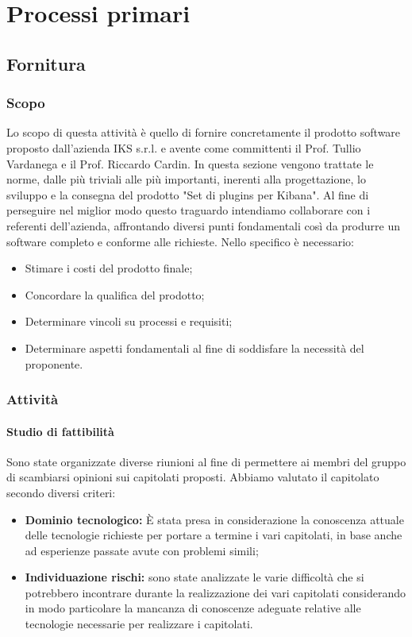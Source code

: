 \section{Processi primari}

\subsection{Fornitura}
	
	\subsubsection{Scopo}
	Lo scopo di questa attività è quello di fornire concretamente il prodotto software proposto dall'azienda IKS s.r.l. e avente come committenti il Prof. Tullio Vardanega e il Prof. Riccardo Cardin.
	In questa sezione vengono trattate le norme, dalle più triviali alle più importanti, inerenti alla progettazione, lo sviluppo e la consegna del prodotto "Set di plugins per Kibana".
	Al fine di perseguire nel miglior modo questo traguardo intendiamo collaborare con i referenti dell'azienda, affrontando diversi punti fondamentali così da produrre un software completo e conforme alle richieste. Nello specifico è necessario:
    \begin{itemize}
	\item Stimare i costi del prodotto finale;
	\item Concordare la qualifica del prodotto;
	\item Determinare vincoli su processi e requisiti;
	\item Determinare aspetti fondamentali al fine di soddisfare la necessità del proponente.
	\end{itemize}
	\subsubsection{Attività} 
		\paragraph{Studio di fattibilità} \Spazio
		Sono state organizzate diverse riunioni al fine di permettere ai membri del gruppo di scambiarsi opinioni sui capitolati proposti. 
		Abbiamo valutato il capitolato secondo diversi criteri:
		\begin{itemize}
			\item \textbf{Dominio tecnologico:} È stata presa in considerazione la conoscenza attuale delle tecnologie richieste per portare a termine i vari capitolati, in base anche ad esperienze passate avute con problemi simili;
			\item \textbf{Individuazione rischi:} sono state analizzate le varie difficoltà che si potrebbero incontrare durante la realizzazione dei vari capitolati considerando in modo particolare la mancanza di conoscenze adeguate relative alle tecnologie necessarie per realizzare i capitolati.
		\end{itemize}  
